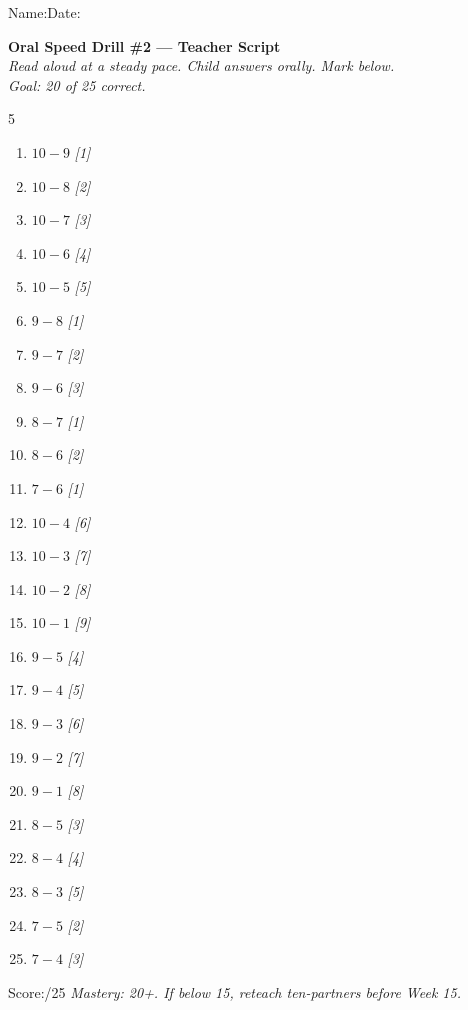 \documentclass[12pt, letterpaper]{article}
\begin{document}

{\small Name:\ansblanklg \hfill Date:\ansblank}
\goldrule

\begin{mdframed}[backgroundcolor=sd-gold!15,linecolor=sd-gold,linewidth=1.5pt,roundcorner=4pt,
  innerleftmargin=10pt,innerrightmargin=10pt,innertopmargin=8pt,innerbottommargin=8pt]
\textbf{\color{sd-gold}Oral Speed Drill \#2 — Teacher Script}\\[4pt]
\textit{Read aloud at a steady pace. Child answers orally. Mark below.}\\
\textit{Goal: 20 of 25 correct.}\\[6pt]
\begin{multicols}{5}
\begin{enumerate}[leftmargin=*,label=\small\arabic*.,itemsep=1pt]
  \item $10-9$ \textit{[1]}
  \item $10-8$ \textit{[2]}
  \item $10-7$ \textit{[3]}
  \item $10-6$ \textit{[4]}
  \item $10-5$ \textit{[5]}
  \item $9-8$ \textit{[1]}
  \item $9-7$ \textit{[2]}
  \item $9-6$ \textit{[3]}
  \item $8-7$ \textit{[1]}
  \item $8-6$ \textit{[2]}
  \item $7-6$ \textit{[1]}
  \item $10-4$ \textit{[6]}
  \item $10-3$ \textit{[7]}
  \item $10-2$ \textit{[8]}
  \item $10-1$ \textit{[9]}
  \item $9-5$ \textit{[4]}
  \item $9-4$ \textit{[5]}
  \item $9-3$ \textit{[6]}
  \item $9-2$ \textit{[7]}
  \item $9-1$ \textit{[8]}
  \item $8-5$ \textit{[3]}
  \item $8-4$ \textit{[4]}
  \item $8-3$ \textit{[5]}
  \item $7-5$ \textit{[2]}
  \item $7-4$ \textit{[3]}
\end{enumerate}
\end{multicols}
\noindent Score:\underline{\hspace{1.5cm}}/25\hfill
\textit{Mastery: 20+. If below 15, reteach ten-partners before Week 15.}
\end{mdframed}
\end{document}
